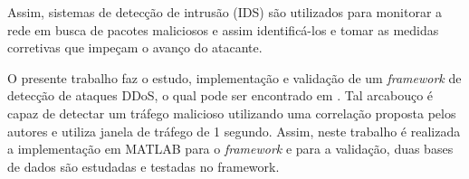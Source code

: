 Assim, sistemas de detecção de intrusão (IDS) são utilizados para monitorar a rede em busca de pacotes maliciosos e assim identificá-los e tomar as medidas corretivas que impeçam o avanço do atacante.

O presente trabalho faz o estudo, implementação e validação de um \textit{framework} de detecção de ataques DDoS, o qual pode ser encontrado em \cite{HOQUE201748}. Tal arcabouço é capaz de detectar um tráfego malicioso utilizando uma correlação proposta pelos autores e utiliza janela de tráfego de 1 segundo. Assim, neste trabalho é realizada a implementação em MATLAB para o \textit{framework}  e para a validação, duas bases de dados são estudadas e testadas no framework.  
 


